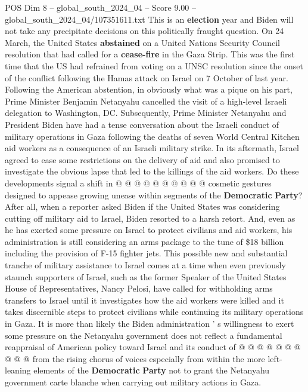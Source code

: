 \begin{textsample}{POS Dim 8 – global\_south\_2024\_04 – Score 9.00 – global\_south\_2024\_04/107351611.txt}  \label{ex:f8_pos_190}
This is an \textbf{election} year and Biden will not take any precipitate decisions on this politically fraught question.
On 24 March, the United States \textbf{abstained} on a United Nations Security Council resolution that had called for a \textbf{cease-fire} in the Gaza Strip.
This was the first time that the US had refrained from voting on a UNSC resolution since the onset of the conflict following the Hamas attack on Israel on 7 October of last year.
Following the American abstention, in obviously what was a pique on his part, Prime Minister Benjamin Netanyahu cancelled the visit of a high-level Israeli delegation to Washington, DC.
Subsequently, Prime Minister Netanyahu and President Biden have had a tense conversation about the Israeli conduct of military operations in Gaza following the deaths of seven World Central Kitchen aid workers as a consequence of an Israeli military strike.
In its aftermath, Israel agreed to ease some restrictions on the delivery of aid and also promised to investigate the obvious lapse that led to the killings of the aid workers.
Do these developments signal a shift in @ @ @ @ @ @ @ @ @ @ cosmetic gestures designed to appease growing unease within segments of the \textbf{Democratic} \textbf{Party}?
After all, when a reporter asked Biden if the United States was considering cutting off military aid to Israel, Biden resorted to a harsh retort.
And, even as he has exerted some pressure on Israel to protect civilians and aid workers, his administration is still considering an arms package to the tune of \$18 billion including the provision of F-15 fighter jets.
This possible new and substantial tranche of military assistance to Israel comes at a time when even previously staunch supporters of Israel, such as the former Speaker of the United States House of Representatives, Nancy Pelosi, have called for withholding arms transfers to Israel until it investigates how the aid workers were killed and it takes discernible steps to protect civilians while continuing its military operations in Gaza.
It is more than likely the Biden administration ' s willingness to exert some pressure on the Netanyahu government does not reflect a fundamental reappraisal of American policy toward Israel and its conduct of @ @ @ @ @ @ @ @ @ @ from the rising chorus of voices especially from within the more left-leaning elements of the \textbf{Democratic} \textbf{Party} not to grant the Netanyahu government carte blanche when carrying out military actions in Gaza.

\end{textsample}
